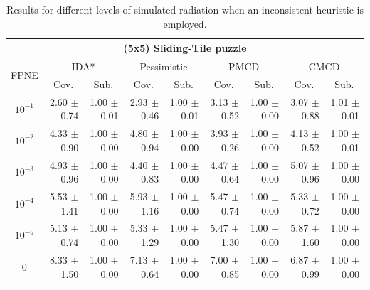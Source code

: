\documentclass[letterpaper]{article}
\begin{document}
\begin{table}[t]
\centering
\setlength{\tabcolsep}{5 pt}
\begin{tabular}{| c | r  r | r  r | r  r | r  r |}
\hline
\multicolumn{9}{|c|}{\textbf{(5x5) Sliding-Tile puzzle}} \\
\hline
\multirow{2}{*}{FPNE}	& \multicolumn{2}{|c|}{IDA*} 	& \multicolumn{2}{|c|}{Pessimistic} 	& \multicolumn{2}{|c|}{PMCD} 	& \multicolumn{2}{|c|}{CMCD} 	\\
\cline{2-9}
	& \multicolumn{1}{c}{Cov.} & \multicolumn{1}{c|}{Sub.} 	& \multicolumn{1}{c}{Cov.} & \multicolumn{1}{c|}{Sub.} 	& \multicolumn{1}{c}{Cov.} & \multicolumn{1}{c|}{Sub.} 	& \multicolumn{1}{c}{Cov.} & \multicolumn{1}{c|}{Sub.} 	\\
\hline
$10^{-1}$	 & 2.60 $\pm$ 0.74	 & 1.00 $\pm$ 0.01	 & 2.93 $\pm$ 0.46	 & 1.00 $\pm$ 0.01	 & 3.13 $\pm$ 0.52	 & 1.00 $\pm$ 0.00	 & 3.07 $\pm$ 0.88	 & 1.01 $\pm$ 0.01	\\
$10^{-2}$	 & 4.33 $\pm$ 0.90	 & 1.00 $\pm$ 0.00	 & 4.80 $\pm$ 0.94	 & 1.00 $\pm$ 0.00	 & 3.93 $\pm$ 0.26	 & 1.00 $\pm$ 0.00	 & 4.13 $\pm$ 0.52	 & 1.00 $\pm$ 0.01	\\
$10^{-3}$	 & 4.93 $\pm$ 0.96	 & 1.00 $\pm$ 0.00	 & 4.40 $\pm$ 0.83	 & 1.00 $\pm$ 0.00	 & 4.47 $\pm$ 0.64	 & 1.00 $\pm$ 0.00	 & 5.07 $\pm$ 0.96	 & 1.00 $\pm$ 0.00	\\
$10^{-4}$	 & 5.53 $\pm$ 1.41	 & 1.00 $\pm$ 0.00	 & 5.93 $\pm$ 1.16	 & 1.00 $\pm$ 0.00	 & 5.47 $\pm$ 0.74	 & 1.00 $\pm$ 0.00	 & 5.33 $\pm$ 0.72	 & 1.00 $\pm$ 0.00	\\
$10^{-5}$	 & 5.13 $\pm$ 0.74	 & 1.00 $\pm$ 0.00	 & 5.33 $\pm$ 1.29	 & 1.00 $\pm$ 0.00	 & 5.47 $\pm$ 1.30	 & 1.00 $\pm$ 0.00	 & 5.87 $\pm$ 1.60	 & 1.00 $\pm$ 0.00	\\
0 	 & 8.33 $\pm$ 1.50	 & 1.00 $\pm$ 0.00 	 & 7.13 $\pm$ 0.64	 & 1.00 $\pm$ 0.00 	 & 7.00 $\pm$ 0.85	 & 1.00 $\pm$ 0.00 	 & 6.87 $\pm$ 0.99	 & 1.00 $\pm$ 0.00 	\\
\hline
\end{tabular}
\caption{Results for different levels of simulated radiation when an inconsistent heuristic is employed.}
\label{tab:24puzzle}
\end{table}
\end{document}
